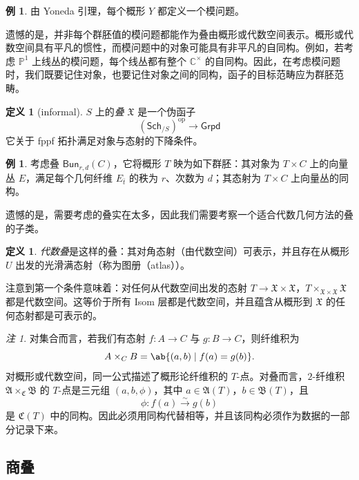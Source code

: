 \documentclass{amsart}
\theoremstyle{definition}
\newtheorem{defn}[thm]{定义}
\newtheorem{exm}[thm]{例}
\theoremstyle{remark}
\newtheorem{rmk}[thm]{注}
\theoremstyle{plain}
\theoremstyle{definition}
\theoremstyle{remark}
\newcommand{\C}{\mathbb{C}}
\renewcommand{\P}{\mathbb{P}}
\newcommand{\mf}[1]{\mathfrak{#1}}
\newcommand{\mr}[1]{\mathrm{#1}}
\newcommand{\ms}[1]{\mathsf{#1}}
\newcommand{\1}{\mathbf{1}}
\newcommand{\2}{\mathbf{2}}
\newcommand{\3}{\mathbf{3}}
\begin{document}
\begin{exm}
    由 Yoneda 引理，每个概形 \(Y\) 都定义一个模问题。
\end{exm}

遗憾的是，并非每个群胚值的模问题都能作为叠由概形或代数空间表示。概形或代数空间具有平凡的惯性，而模问题中的对象可能具有非平凡的自同构。例如，若考虑 \(\P^1\) 上线丛的模问题，每个线丛都有整个 \(\C^{\times}\) 的自同构。因此，在考虑模问题时，我们既要记住对象，也要记住对象之间的同构，函子的目标范畴应为群胚范畴。

\begin{defn}[informal]
    \(S\) 上的\textit{叠} \(\mf{X}\) 是一个伪函子
    \[ (\ms{Sch}_{/S})^{\mr{op}} \to \ms{Grpd} \]
    它关于 fppf 拓扑满足对象与态射的下降条件。
\end{defn}

\begin{exm}
    考虑叠 \(\ms{Bun}_{r,d}(C)\)，它将概形 \(T\) 映为如下群胚：其对象为 \(T\times C\) 上的向量丛 \(E\)，满足每个几何纤维 \(E_{\bar t}\) 的秩为 \(r\)、次数为 \(d\)；其态射为 \(T\times C\) 上向量丛的同构。
\end{exm}

遗憾的是，需要考虑的叠实在太多，因此我们需要考察一个适合代数几何方法的叠的子类。

\begin{defn}
    \textit{代数叠}是这样的叠：其对角态射（由代数空间）可表示，并且存在从概形 \(U\) 出发的光滑满态射（称为图册（atlas））。
\end{defn}

注意到第一个条件意味着：对任何从代数空间出发的态射 \(T \to \mf{X} \times \mf{X}\)，\(T \times_{\mf{X} \times \mf{X}} \mf{X}\) 都是代数空间。这等价于所有 Isom 层都是代数空间，并且蕴含从概形到 \(\mf{X}\) 的任何态射都是可表示的。

\begin{rmk}
    对集合而言，若我们有态射 \(f\colon A\to C\) 与 \(g\colon B\to C\)，则纤维积为
    \[ 
        A\times_C B=\ab\{(a,b)\mid f(a)=g(b)\}. 
    \] 
    对概形或代数空间，同一公式描述了概形论纤维积的 \(T\)-点。对叠而言，\(2\)-纤维积 \(\mf{A}\times_{\mf{C}}\mf{B}\) 的 \(T\)-点是三元组 \((a,b,\phi)\)，其中 \(a\in\mf{A}(T)\)，\(b\in\mf{B}(T)\)，且
    \[ 
        \phi\colon f(a)\xrightarrow{\sim}g(b) 
    \]
    是 \(\mf{C}(T)\) 中的同构。因此必须用同构代替相等，并且该同构必须作为数据的一部分记录下来。
\end{rmk}


\subsection{商叠}%
\label{sub:Quotient stacks}
\end{document}
